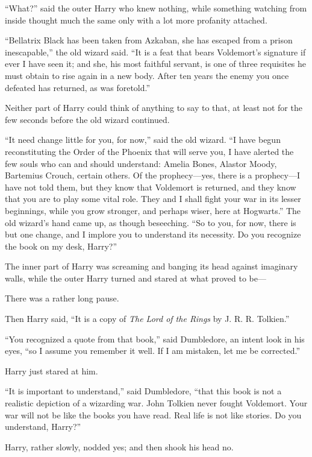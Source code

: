 “What?” said the outer Harry who knew nothing, while something watching from inside thought much the same only with a lot more profanity attached.

“Bellatrix Black has been taken from Azkaban, she has escaped from a prison inescapable,” the old wizard said. “It is a feat that bears Voldemort’s signature if ever I have seen it; and she, his most faithful servant, is one of three requisites he must obtain to rise again in a new body. After ten years the enemy you once defeated has returned, as was foretold.”

Neither part of Harry could think of anything to say to that, at least not for the few seconds before the old wizard continued.

“It need change little for you, for now,” said the old wizard. “I have begun reconstituting the Order of the Phoenix that will serve you, I have alerted the few souls who can and should understand: Amelia Bones, Alastor Moody, Bartemius Crouch, certain others. Of the prophecy—yes, there is a prophecy—I have not told them, but they know that Voldemort is returned, and they know that you are to play some vital role. They and I shall fight your war in its lesser beginnings, while you grow stronger, and perhaps wiser, here at Hogwarts.” The old wizard’s hand came up, as though beseeching. “So to you, for now, there is but one change, and I implore you to understand its necessity. Do you recognize the book on my desk, Harry?”

The inner part of Harry was screaming and banging its head against imaginary walls, while the outer Harry turned and stared at what proved to be—

There was a rather long pause.

Then Harry said, “It is a copy of \emph{The Lord of the Rings} by J. R. R. Tolkien.”

“You recognized a quote from that book,” said Dumbledore, an intent look in his eyes, “so I assume you remember it well. If I am mistaken, let me be corrected.”

Harry just stared at him.

“It is important to understand,” said Dumbledore, “that this book is not a realistic depiction of a wizarding war. John Tolkien never fought Voldemort. Your war will not be like the books you have read. Real life is not like stories. Do you understand, Harry?”

Harry, rather slowly, nodded yes; and then shook his head no.


